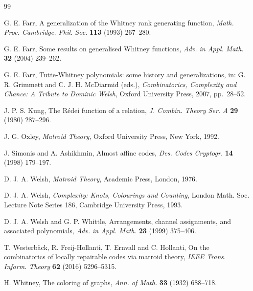 \documentclass[12pt]{article}
\begin{document}


\begin{thebibliography}{99}

G. E. Farr,
A generalization of the Whitney rank generating function,
\textit{Math. Proc. Cambridge. Phil. Soc.} \textbf{113} (1993) 267--280.

G. E. Farr,
Some results on generalised Whitney functions,
\textit{Adv. in Appl. Math.} \textbf{32} (2004) 239--262.

G. E. Farr,
Tutte-Whitney polynomials: some history and generalizations,
in: G. R. Grimmett and C. J. H. McDiarmid (eds.),
\textit{Combinatorics, Complexity and Chance: A Tribute to
Dominic Welsh},
Oxford University Press, 2007, pp.\ 28--52.

J. P. S. Kung,
The R\'edei function of a relation,
\textit{J. Combin. Theory Ser. A} \textbf{29} (1980) 287--296.

J. G. Oxley, \textit{Matroid Theory}, Oxford University Press,
New York, 1992.

J. Simonis and A. Ashikhmin,
Almost affine codes,
\textit{Des. Codes Cryptogr.} \textbf{14}  (1998) 179--197.

D. J. A. Welsh,
\textit{Matroid Theory},
Academic Press, London, 1976.

D. J. A. Welsh,
\textit{Complexity: Knots, Colourings and Counting},
London Math. Soc. Lecture Note Series 186,
Cambridge University Press, 1993.

D. J. A. Welsh and G. P. Whittle,
Arrangements, channel assignments, and associated polynomials,
\textit{Adv. in Appl. Math.} \textbf{23} (1999) 375--406.

T. Westerb\"ack, R. Freij-Hollanti, T. Ernvall and C. Hollanti,
On the combinatorics of locally repairable codes via matroid theory,
\textit{IEEE Trans. Inform. Theory} \textbf{62} (2016) 5296--5315.

H. Whitney,
The coloring of graphs,
\textit{Ann. of Math.} \textbf{33} (1932) 688--718.

\end{thebibliography}
\end{document}
